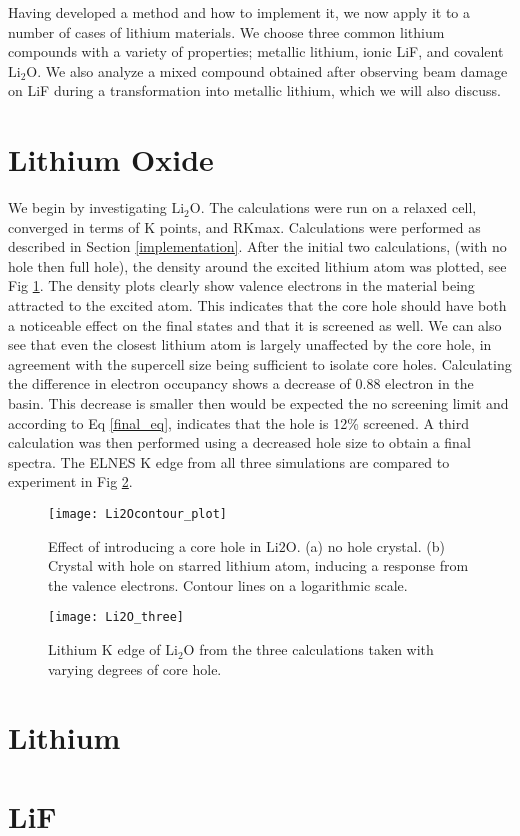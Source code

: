 
Having developed a method and how to implement it, we now apply it to a number of cases of lithium materials.   We choose three common lithium compounds with a variety of properties; metallic lithium, ionic LiF, and covalent $\mathrm{Li_2O}$.  We also analyze a mixed compound obtained after observing beam damage on LiF during a transformation into metallic lithium, which we will also discuss.  

\section{Lithium Oxide}

We begin by investigating $ \mathrm{Li_2O} $.  The calculations were run on a relaxed cell, converged in terms of K points, and RKmax.  Calculations were performed as described in Section \ref{implementation}.   After the initial two calculations, (with no hole then full hole), the density around the excited lithium atom was plotted, see Fig \ref{Li2O_contour}.  The density plots clearly show valence electrons in the material being attracted to the excited atom. This indicates that the core hole should have both a noticeable effect on the final states and that it is screened as well.  We can also see that even the closest lithium atom is largely unaffected by the core hole, in agreement with the supercell size being sufficient to isolate core holes.  Calculating the difference in electron occupancy shows a decrease of 0.88 electron in the basin.  This decrease is smaller then would be expected the no screening limit and according to Eq \ref{final_eq}, indicates that the hole is 12\% screened.  A third calculation was then performed using a decreased hole size to obtain a final spectra.  The ELNES K edge from all three simulations are compared to experiment in Fig \ref{Li2O_three}.  



\begin{figure}
	\centering
	\texttt{[image: Li2Ocontour\_plot]}
	\caption{Effect of introducing a core hole in $ \mathrm{Li2O} $.  (a) no hole crystal.  (b) Crystal with hole on starred lithium atom, inducing a response from the valence electrons.  Contour lines on a logarithmic scale. }
	\label{Li2O_contour}
\end{figure}

\begin{figure}
	\centering
	\texttt{[image: Li2O\_three]}
	\caption{Lithium K edge of $ \mathrm{Li_2O} $ from the three calculations taken with varying degrees of core hole. }
	\label{Li2O_three}
\end{figure}

\section{Lithium}

\section{LiF}


\newpage




